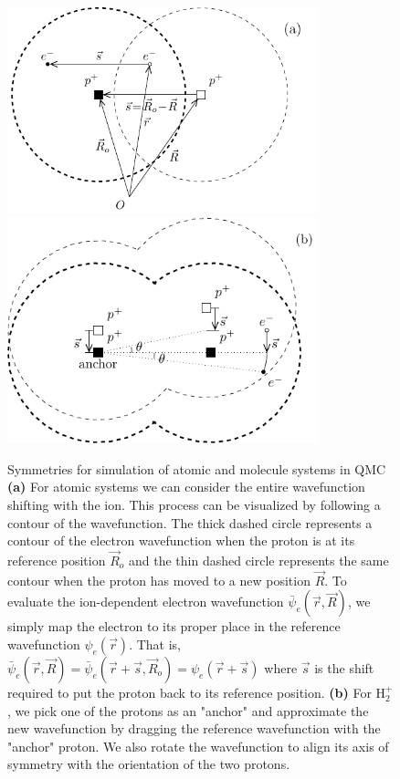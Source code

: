 \documentclass[pra,superscriptaddress,groupedaddress,twocolumn]{revtex4}
\begin{document}
\begin{figure}[t]
\includegraphics[width=9cm]{fig1a.pdf}
\includegraphics[width=9cm]{fig1b.pdf}
\caption{ Symmetries for simulation of atomic and molecule systems in QMC {\bf (a)} For atomic systems we can consider the entire wavefunction shifting with the ion. This process can be visualized by following a contour of the wavefunction. The thick dashed circle represents a contour of the electron wavefunction when the proton is at its reference position $\vec{R}_o$ and the thin dashed circle represents the same contour when the proton has moved to a new position $\vec{R}$. To evaluate the ion-dependent electron wavefunction $\bar{\psi}_e(\vec{r},\vec{R})$, we simply map the electron to its proper place in the reference wavefunction $\psi_e(\vec{r})$. That is, $\bar{\psi}_e(\vec{r},\vec{R})=\bar{\psi}_e(\vec{r}+\vec{s},\vec{R}_o)=\psi_e(\vec{r}+\vec{s})$ where $\vec{s}$ is the shift required to put the proton back to its reference position. {\bf (b)} For H$_2^+$, we pick one of the protons as an "anchor" and approximate the new wavefunction by dragging the reference wavefunction with the "anchor" proton. We also rotate the wavefunction to align its axis of symmetry with the orientation of the two protons. \label{fig:drag}}
\end{figure}
\end{document}
